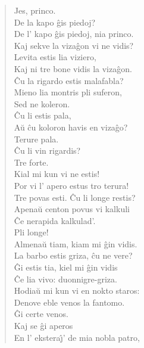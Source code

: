 \begin{verse}
 Jes, princo.\\
 De la kapo \^gis piedoj?\\
 De l' kapo \^gis piedoj, nia princo.\\
 Kaj sekve la viza\^gon vi ne vidis?\\
 Levita estis lia viziero,\\
                Kaj ni tre bone vidis la viza\^gon.\\
 \^Cu la rigardo estis malafabla?\\
 Mieno lia montris pli suferon,\\
                 Sed ne koleron.\\
 \^Cu li estis pala,\\
                A\u u \^cu koloron havis en viza\^go?\\
 Terure pala.\\
 \^Cu li vin rigardis?\\
 Tre forte.\\
 Kial mi kun vi ne estis!\\
 Por vi l' apero estus tro terura!\\
 Tre povas esti. \^Cu li longe restis?\\
 Apena\u u centon povus vi kalkuli\\
                \^Ce nerapida kalkulad'.\\
 Pli longe!\\
 Almena\u u tiam, kiam mi \^gin vidis.\\
 La barbo estis griza, \^cu ne vere?\\
 \^Gi estis tia, kiel mi \^gin vidis\\
                \^Ce lia vivo: duonnigre-griza.\\
 Hodia\u u mi kun vi en nokto staros:\\
                Denove eble venos la fantomo.\\
 \^Gi certe venos.\\
 Kaj se \^gi aperos\\
                En l' ekstera\^{\j}' de mia nobla patro,\\

\end{verse}
